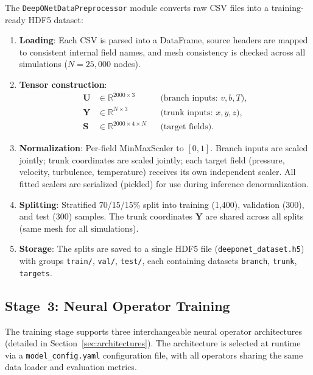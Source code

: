 \documentclass[journal]{IEEEtran}
\begin{document}
The \texttt{DeepONetDataPreprocessor} module converts raw CSV files into a training-ready HDF5 dataset:

\begin{enumerate}
    \item \textbf{Loading}: Each CSV is parsed into a DataFrame, source headers are mapped to consistent internal field names, and mesh consistency is checked across all simulations ($N=25{,}000$ nodes).
    
    \item \textbf{Tensor construction}:
    \begin{align}
    \bm{U} &\in \mathbb{R}^{2000 \times 3} && \text{(branch inputs: $v,b,T$)}, \\
    \bm{Y} &\in \mathbb{R}^{N \times 3} && \text{(trunk inputs: $x,y,z$)}, \\
    \bm{S} &\in \mathbb{R}^{2000 \times 4 \times N} && \text{(target fields)}.
    \end{align}
    
    \item \textbf{Normalization}: Per-field MinMaxScaler to $[0,1]$. Branch inputs are scaled jointly; trunk coordinates are scaled jointly; each target field (pressure, velocity, turbulence, temperature) receives its own independent scaler. All fitted scalers are serialized (pickled) for use during inference denormalization.
    
    \item \textbf{Splitting}: Stratified 70/15/15\% split into training (1,400), validation (300), and test (300) samples. The trunk coordinates $\bm{Y}$ are shared across all splits (same mesh for all simulations).
    
    \item \textbf{Storage}: The splits are saved to a single HDF5 file (\texttt{deeponet\_dataset.h5}) with groups \texttt{train/}, \texttt{val/}, \texttt{test/}, each containing datasets \texttt{branch}, \texttt{trunk}, \texttt{targets}.
\end{enumerate}

\subsection{Stage~3: Neural Operator Training}

The training stage supports three interchangeable neural operator architectures (detailed in Section~\ref{sec:architectures}). The architecture is selected at runtime via a \texttt{model\_config.yaml} configuration file, with all operators sharing the same data loader and evaluation metrics.
\end{document}
